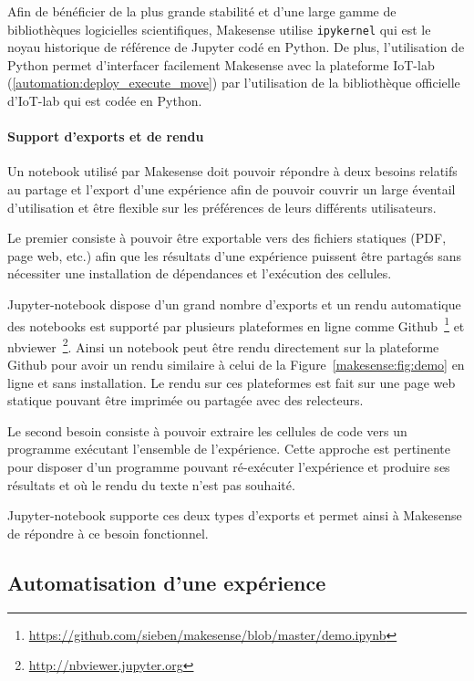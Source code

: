 Afin de bénéficier de la plus grande stabilité et d'une large gamme de bibliothèques logicielles scientifiques, Makesense utilise \texttt{ipykernel} qui est le noyau historique de référence de Jupyter codé en Python.
De plus, l'utilisation de Python permet d'interfacer facilement Makesense avec la plateforme IoT-lab (\ref{automation:deploy_execute_move}) par l'utilisation de la bibliothèque officielle d'IoT-lab qui est codée en Python.

\paragraph{Support d'exports et de rendu}

Un notebook utilisé par Makesense doit pouvoir répondre à deux besoins relatifs au partage et l'export d'une expérience afin de pouvoir couvrir un large éventail d'utilisation et être flexible sur les préférences de leurs différents utilisateurs.

Le premier consiste à pouvoir être exportable vers des fichiers statiques (\ac{PDF}, page web, etc.) afin que les résultats d'une expérience puissent être partagés sans nécessiter une installation de dépendances et l'exécution des cellules.

Jupyter-notebook dispose d'un grand nombre d'exports et un rendu automatique des notebooks est supporté par plusieurs plateformes en ligne comme Github~\footnote{\href{https://github.com/sieben/makesense/blob/master/demo.ipynb}{https://github.com/sieben/makesense/blob/master/demo.ipynb}} et nbviewer~\footnote{\href{http://nbviewer.jupyter.org/}{http://nbviewer.jupyter.org}}.
Ainsi un notebook peut être rendu directement sur la plateforme Github pour avoir un rendu similaire à celui de la Figure~\ref{makesense:fig:demo} en ligne et sans installation.
Le rendu sur ces plateformes est fait sur une page web statique pouvant être imprimée ou partagée avec des relecteurs.

Le second besoin consiste à pouvoir extraire les cellules de code vers un programme exécutant l'ensemble de l'expérience.
Cette approche est pertinente pour disposer d'un programme pouvant ré-exécuter l'expérience et produire ses résultats et où le rendu du texte n'est pas souhaité.

Jupyter-notebook supporte ces deux types d'exports et permet ainsi à Makesense de répondre à ce besoin fonctionnel.

\subsection{Automatisation d'une expérience}
\label{makesense:auto}

